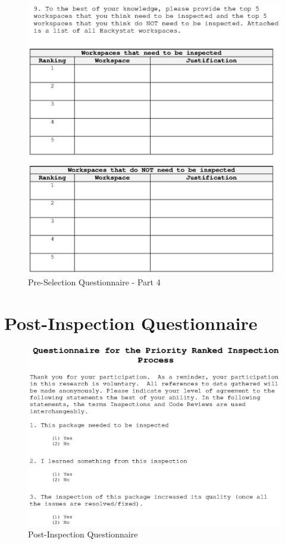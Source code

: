 \begin{figure}[htbp]
  \centering
  \includegraphics[width=1.0\textwidth]{figs/Questionnaire-Pre-shrunk_4.eps}
  \caption{Pre-Selection Questionnaire - Part 4}
  \label{fig:questionnaire-pre4}
\end{figure}


\chapter{Post-Inspection Questionnaire}
\label{appendix:post-inspection-questionnaire}

\begin{figure}[!htbp]
  \centering
  \includegraphics[width=1.0\textwidth]{figs/Questionnaire-Post-Inspection-shrunk.eps}
  \caption{Post-Inspection Questionnaire}
  \label{fig:questionnaire-post-inspection}
\end{figure}


